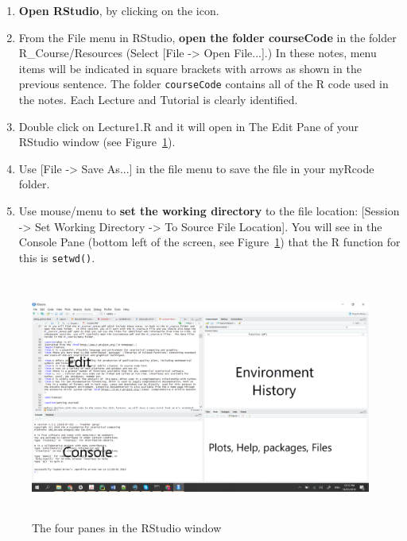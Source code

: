 \documentclass[titlepage]{book}\usepackage{knitr}
\begin{document}
\begin{enumerate}

\item {\textbf{Open RStudio}, by clicking on the icon.}

\item{From the File menu in RStudio, \textbf{open the folder courseCode} in the folder R\_Course/Resources  (Select [File -> Open File...].) In these notes, menu items will be indicated in square brackets with arrows as shown in the previous sentence.  The folder \texttt{courseCode} contains all of the R code used in the notes.  Each Lecture and Tutorial is clearly identified.} 

\item{Double click on Lecture1.R and it will open in The Edit Pane  of your RStudio window (see Figure~\ref{fig:Screenshot}).}

\item{Use [File -> Save As...] in the file menu to save the file in your myRcode folder.}  

\item{Use mouse/menu to \textbf{set the working directory} to the file location: [Session -> Set Working Directory -> To Source File Location]. You will see in the Console Pane (bottom left of the screen, see Figure~\ref{fig:Screenshot}) that the R function for this is \texttt{setwd()}.}

\end{enumerate}

\begin{figure}[!ht]
\graphicspath{{./Images/}}
\includegraphics[width = 16cm, height = 8cm]{Screenshot1.png}
\caption{The four panes in the RStudio window}
\label{fig:Screenshot}
\end{figure}
\end{document}
